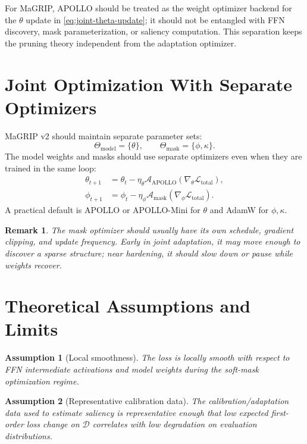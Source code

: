\documentclass[11pt]{article}
\newtheorem{assumption}{Assumption}
\newtheorem{remark}{Remark}
\newcommand{\Loss}{\mathcal{L}}
\newcommand{\Data}{\mathcal{D}}
\begin{document}
For MaGRIP, APOLLO should be treated as the weight optimizer backend for the $\theta$ update in \eqref{eq:joint-theta-update}; it should not be entangled with FFN discovery, mask parameterization, or saliency computation. This separation keeps the pruning theory independent from the adaptation optimizer.

\section{Joint Optimization With Separate Optimizers}

MaGRIP v2 should maintain separate parameter sets:
\begin{equation}
  \Theta_{\mathrm{model}} = \{\theta\},
  \qquad
  \Theta_{\mathrm{mask}} = \{\phi,\kappa\}.
\end{equation}
The model weights and masks should use separate optimizers even when they are trained in the same loop:
\begin{align}
  \theta_{t+1}
  &=
  \theta_t
  -
  \eta_{\theta}
  \mathcal{A}_{\mathrm{APOLLO}}
  \left(
    \nabla_{\theta}\Loss_{\mathrm{total}}
  \right),
  \\
  \phi_{t+1}
  &=
  \phi_t
  -
  \eta_{\phi}
  \mathcal{A}_{\mathrm{mask}}
  \left(
    \nabla_{\phi}\Loss_{\mathrm{total}}
  \right).
\end{align}
A practical default is APOLLO or APOLLO-Mini for $\theta$ and AdamW for $\phi,\kappa$.

\begin{remark}
The mask optimizer should usually have its own schedule, gradient clipping, and update frequency. Early in joint adaptation, it may move enough to discover a sparse structure; near hardening, it should slow down or pause while weights recover.
\end{remark}

\section{Theoretical Assumptions and Limits}

\begin{assumption}[Local smoothness]
The loss is locally smooth with respect to FFN intermediate activations and model weights during the soft-mask optimization regime.
\end{assumption}

\begin{assumption}[Representative calibration data]
The calibration/adaptation data used to estimate saliency is representative enough that low expected first-order loss change on $\Data$ correlates with low degradation on evaluation distributions.
\end{assumption}
\end{document}
